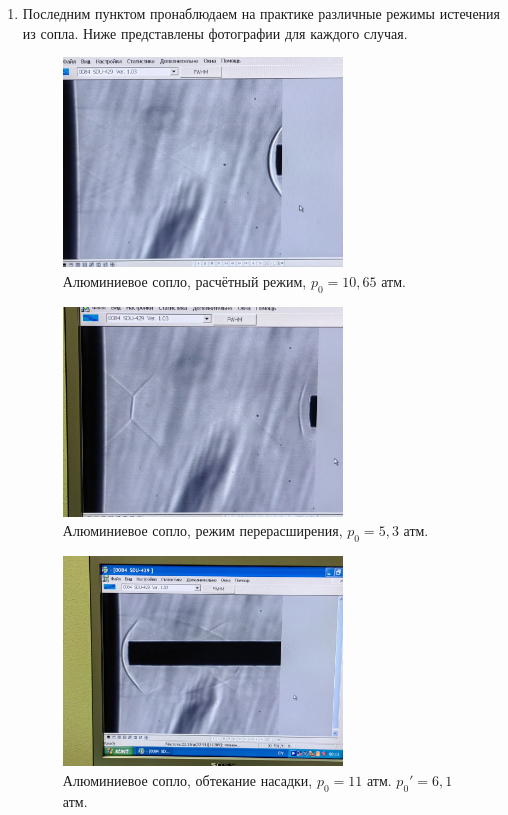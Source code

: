 \documentclass[a4paper,12pt]{article}
\begin{document}
\begin{enumerate}
    \item
    Последним пунктом пронаблюдаем на практике различные режимы истечения из сопла. Ниже представлены фотографии для каждого случая.
    \begin{figure}[H]\label{fig: exp norm mode}
        \centering
        \includegraphics[width = 0.7\textwidth]{Эксп Расчёт.png}
        \caption{Алюминиевое сопло, расчётный режим, $p_0 = 10,65$ атм.}
    \end{figure}
    \begin{figure}[H]\label{fig: exp overexpansion}
        \centering
        \includegraphics[width = 0.7\textwidth]{Эксп Пере.png}
        \caption{Алюминиевое сопло, режим перерасширения, $p_0 = 5,3$ атм.}
    \end{figure}
    \begin{figure}[H]\label{fig: exp nozzle flow}
        \centering
        \includegraphics[width = 0.7\textwidth]{Эксп Обтекание насадки.png}
        \caption{Алюминиевое сопло, обтекание насадки, $p_0 = 11$ атм. $p_0' = 6,1$ атм.}
    \end{figure}
    
\end{enumerate}
\end{document}
